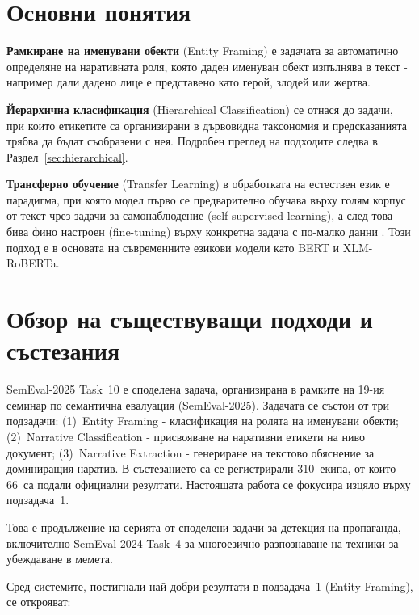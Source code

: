 \documentclass[12pt,a4paper]{report}
\begin{document}
\section{Основни понятия}

\textbf{Рамкиране на именувани обекти} (Entity Framing) е задачата за автоматично определяне на наративната роля, която даден именуван обект изпълнява в текст - например дали дадено лице е представено като герой, злодей или жертва.

\textbf{Йерархична класификация} (Hierarchical Classification) се отнася до задачи, при които етикетите са организирани в дървовидна таксономия и предсказанията трябва да бъдат съобразени с нея. Подробен преглед на подходите следва в Раздел~\ref{sec:hierarchical}.

\textbf{Трансферно обучение} (Transfer Learning) в обработката на естествен език е парадигма, при която модел първо се предварително обучава върху голям корпус от текст чрез задачи за самонаблюдение (self-supervised learning), а след това бива фино настроен (fine-tuning) върху конкретна задача с по-малко данни \cite{devlin2019bert}. Този подход е в основата на съвременните езикови модели като BERT и XLM-RoBERTa.


\section{Обзор на съществуващи подходи и състезания}

SemEval-2025 Task~10 \cite{piskorski2025semeval} е споделена задача, организирана в рамките на 19-ия семинар по семантична евалуация (SemEval-2025). Задачата се състои от три подзадачи: (1)~Entity Framing - класификация на ролята на именувани обекти; (2)~Narrative Classification - присвояване на наративни етикети на ниво документ; (3)~Narrative Extraction - генериране на текстово обяснение за доминиращия наратив. В състезанието са се регистрирали 310~екипа, от които 66~са подали официални резултати. Настоящата работа се фокусира изцяло върху подзадача~1.

Това е продължение на серията от споделени задачи за детекция на пропаганда, включително SemEval-2024 Task~4 \cite{dimitrov2024semeval} за многоезично разпознаване на техники за убеждаване в мемета.

Сред системите, постигнали най-добри резултати в подзадача~1 (Entity Framing), се открояват:
\end{document}
